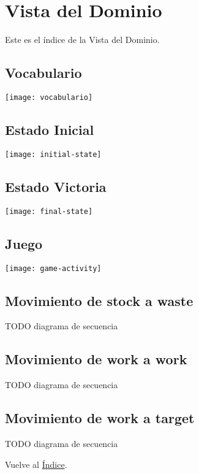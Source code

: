 \newpage{}
\section{Vista del Dominio}
Este es el índice de la Vista del Dominio.

\newpage{}
\subsection{Vocabulario}
\texttt{[image: vocabulario]}

\newpage{}
\subsection{Estado Inicial}
\texttt{[image: initial-state]}

\newpage{}
\subsection{Estado Victoria}
\texttt{[image: final-state]}

\newpage{}
\subsection{Juego}
\texttt{[image: game-activity]}

\newpage{}
\subsection{Movimiento de stock a waste}
TODO diagrama de secuencia

\newpage{}
\subsection{Movimiento de work a work}
TODO diagrama de secuencia

\newpage{}
\subsection{Movimiento de work a target}
TODO diagrama de secuencia

Vuelve al \hyperlink{toc}{Índice}.